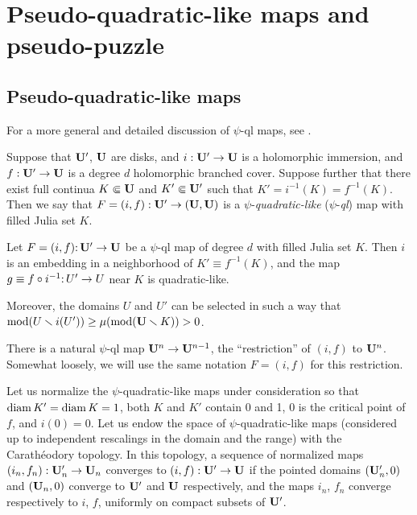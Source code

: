 
\section{Pseudo-quadratic-like maps and pseudo-puzzle}\label{pseudo-puzzle}

\subsection{Pseudo-quadratic-like maps}

For a more general and detailed discussion of $\psi$-ql maps, see \cite{K}.

Suppose that ${\mathbf{U}}'$, ${\mathbf{U}}$ are disks,
and $i:  {\mathbf{U}}' \to {\mathbf{U}}$ is a holomorphic immersion,
and $f: {\mathbf{U}}' \to {\mathbf{U}}$ is a degree $d$ holomorphic branched cover.
Suppose further that there exist full continua $K \Subset {\mathbf{U}}$ and $K'\Subset {\mathbf{U}}'$
such that $K' = i^{-1}(K) = f^{-1}(K)$.
Then we say that $F=(i,f):  {\mathbf{U}}'\rightarrow ({\mathbf{U}}, {\mathbf{U}})$  is a
$\psi$-{\it quadratic-like}
 ($\psi$-{\it ql}) map  with filled Julia set $K$.

\begin{lem}[\cite{K}]\label{ql extension}
Let $F=(i,f)\mathpunct:{\mathbf{U}}'\rightarrow {\mathbf{U}}$ be a $\psi$-ql map of degree $d$
 with filled Julia set $K$.
Then $i$ is an embedding in  a neighborhood of $K' \equiv f^{-1}(K)$,
and the map  $g\equiv  f\circ i^{-1}\mathpunct: U'\rightarrow U$ near $K$ is quadratic-like.

\ssk Moreover, the domains $U$ and $U'$ can be selected in such a way that
$\operatorname{mod}(U\smallsetminus i(U'))\geq \mu (\operatorname{mod}({\mathbf{U}}\smallsetminus K)) >0$.
\end{lem}



There is a natural $\psi$-ql map ${\mathbf{U}}^n\rightarrow {\mathbf{U}}^{n-1}$,
the ``restriction'' of $(i,f)$ to ${\mathbf{U}}^n$.
Somewhat loosely, we will use the same notation $F=(i,f)$ for this restriction.

 Let us normalize  the $\psi$-quadratic-like  maps under consideration
so that $\operatorname{diam} K'= \operatorname{diam} K=1$, both $K$ and $K'$ contain 0 and 1,
$0$ is the critical point of $f$, and $i(0)=0$.
Let us endow the space of $\psi$-quadratic-like maps (considered up to independent rescalings in the domain and the range)
with the Carath\'eodory topology.
In this topology, a sequence of normalized maps $(i_n, f_n): {\mathbf{U}}_n'\rightarrow{\mathbf{U}}_n$ converges to $(i,f): {\mathbf{U}}'\rightarrow {\mathbf{U}}$ if
the pointed domains $({\mathbf{U}}_n', 0)$ and $({\mathbf{U}}_n, 0)$ converge to ${\mathbf{U}}'$ and ${\mathbf{U}}$ respectively,
and the maps $i_n$, $f_n$ converge respectively to $i$, $f$,
uniformly on compact subsets of  ${\mathbf{U}}'$.



